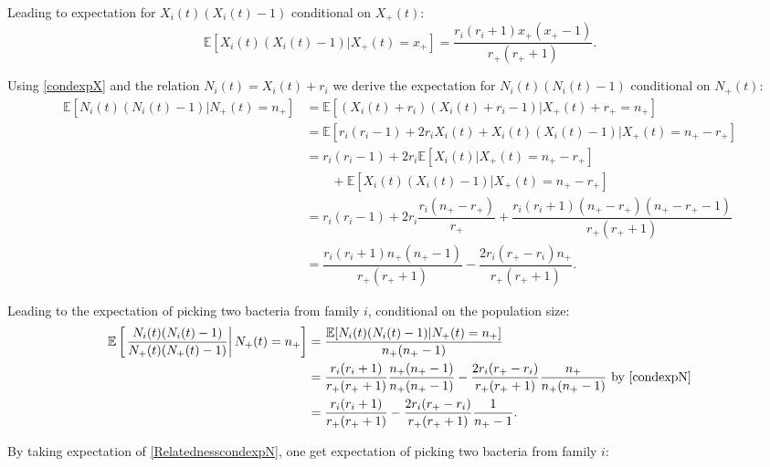 \documentclass{article}
\begin{document}
Leading to expectation for $X_i(t)(X_i(t)-1)$ conditional on $X_+(t)$:
\begin{equation}
 \mathbb{E} [ X_i(t)(X_i(t)-1) \vert X_+(t)=x_+ ] =\dfrac{r_i(r_i+1) x_+ ( x_+ -1 ) }{r_+ (r_+ +1 )}. \label{condexpX}
\end{equation}

Using \eqref{condexpX} and the relation $N_i(t)=X_i(t)+r_i$ we derive the expectation for $N_i(t)(N_i(t)-1)$ conditional on $N_+(t)$:
\begin{align}
 \mathbb{E} [ N_i(t)(N_i(t)-1) \vert N_+(t)=n_+ ] &= \mathbb{E} [ ( X_i(t)+r_i)(X_i(t)+r_i -1) \vert X_+(t)+ r_+ = n_+ ] \\
 &= \mathbb{E} [r_i(r_i-1) + 2r_i X_i(t) + X_i(t)(X_i(t)-1) \vert X_+(t)=n_+ - r_+ ]\\
 &= r_i(r_i-1) + 2 r_i \mathbb{E} [ X_i(t) \vert X_+(t)=n_+ - r_+ ]\\
 & \qquad + \mathbb{E} [X_i(t)(X_i(t)-1) \vert X_+(t)=n_+ - r_+ ]\\
  &= r_i(r_i-1) + 2 r_i \dfrac{r_i (n_+ - r_+)}{r_+ } + \dfrac{r_i(r_i+1) (n_+ - r_+) ( n_+ - r_+ -1 ) }{r_+ (r_+ +1 )}\\
 &=\dfrac{r_i(r_i+1) n_+ ( n_+ -1 ) }{r_+ (r_+ +1)} -\dfrac{2 r_{i} (r_+ - r_i) n_+ }{r_+ (r_+ +1)}. \label{condexpN}
\end{align}
 
Leading to the expectation of picking two bacteria from family $i$, conditional on the population size: 
\begin{align}
  \mathbb{E}\left[ \left. \dfrac{N_i(t)(N_i(t)-1)}{N_+(t)( N_+(t)-1 ) } \right\vert N_+(t)=n_+ \right] &= 
 \dfrac{\mathbb{E}[ N_i(t)(N_i(t)-1) \vert N_+(t)=n_+] }{n_+ (n_+ -1 ) }  \\
 &=\dfrac{r_i(r_i+1)}{r_+ (r_+ +1)} \dfrac{n_+ (n_+ -1 ) }{ n_+ (n_+ -1 ) }- \dfrac{2 r_i (r_+ -r_{i})}{r_+ (r_+ +1)} \dfrac{n_+}{ n_+ (n_+ -1 ) } \text{ by \eqref{condexpN}}\\
 &=\dfrac{r_i(r_i+1)}{r_+ (r_+ +1)}- \dfrac{2 r_i (r_+ -r_{i})}{r_+ (r_+ +1)} \dfrac{1}{ n_+ -1  }. \label{RelatednesscondexpN}
\end{align}

By taking expectation of \eqref{RelatednesscondexpN}, one get expectation of picking two bacteria from family $i$:
\end{document}

